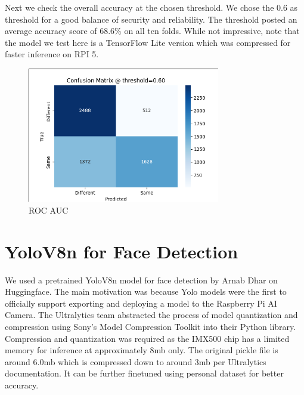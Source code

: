 \clearpage
Next we check the overall accuracy at the chosen threshold. We chose the 0.6 as threshold for a good balance of security and reliability. The threshold posted an average accuracy score of 68.6\% on all ten folds. While not impressive, note that the model we test here is a TensorFlow Lite version which was compressed for faster inference on RPI 5.
 \begin{figure}[h] %
	\centering
	\includegraphics[width=0.75\textwidth]{figures/chapter4/fixed_thresh_matrix.png} %
	\caption{ROC AUC}
	\label{fig:fixed_thresh}
\end{figure}



\section{YoloV8n for Face Detection}
We used a pretrained YoloV8n model for face detection by Arnab Dhar on Huggingface. The main motivation was because Yolo models were the first to officially support exporting and deploying a model to the Raspberry Pi AI Camera. The Ultralytics team abstracted the process of model quantization and compression using Sony's Model Compression Toolkit into their Python library. Compression and quantization was required as the IMX500 chip has a limited memory for inference at approximately 8mb only. The original pickle file is around 6.0mb which is compressed down to around 3mb per Ultralytics documentation. It can be further finetuned using personal dataset for better accuracy. 





